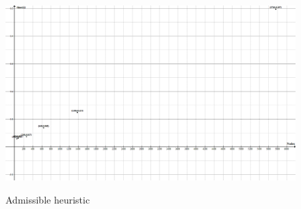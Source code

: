 \documentclass[a4paper,9pt]{article}
\begin{document}
\begin{figure}[H]
	\centering
	\includegraphics[width=\textheight,angle=90]{files/logNonAdm.png}
	\label{fig:lognonadm}
	\caption{Admissible heuristic}
\end{figure}
\end{document}
